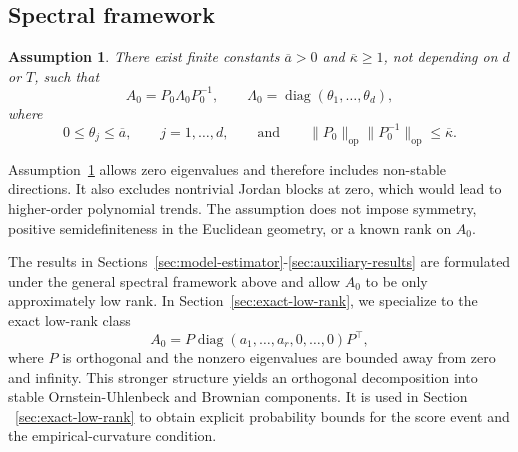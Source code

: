 \documentclass[11pt]{article}
\newtheorem{assumption}[theorem]{Assumption}
\newtheorem{remark}[theorem]{Remark}
\begin{document}
\subsection{Spectral framework}
\label{subsec:spectral-framework}

\begin{assumption}
\label{ass:spectral-structure}
There exist finite constants $\overline a>0$ and $\overline\kappa\geq1$, not
depending on $d$ or $T$, such that
\[
    A_0=P_0\Lambda_0P_0^{-1},
    \qquad
    \Lambda_0=\operatorname{diag}(\theta_1,\ldots,\theta_d),
\]
where
\[
    0\leq\theta_j\leq\overline a,
    \qquad j=1,\ldots,d,
    \qquad\text{and}\qquad
    \|P_0\|_{\mathrm{op}}\|P_0^{-1}\|_{\mathrm{op}}
    \leq\overline\kappa.
\]
\end{assumption}

\noindent
Assumption~\ref{ass:spectral-structure} allows zero eigenvalues and therefore
includes non-stable directions. It also excludes nontrivial Jordan blocks at zero,
which would lead to higher-order polynomial trends. The assumption does not
impose symmetry, positive semidefiniteness in the Euclidean geometry, or a known
rank on $A_0$.



The results in Sections~\ref{sec:model-estimator}-\ref{sec:auxiliary-results}
are formulated under the general spectral framework above and allow $A_0$ to be
only approximately low rank. In Section~\ref{sec:exact-low-rank}, we specialize
to the exact low-rank class
\[
    A_0=P\operatorname{diag}(a_1,\ldots,a_r,0,\ldots,0)P^\top,
\]
where $P$ is orthogonal and the nonzero eigenvalues are bounded away from zero
and infinity. This stronger structure yields an orthogonal decomposition into
stable Ornstein-Uhlenbeck and Brownian components. It is used in
Section ~\ref{sec:exact-low-rank} to obtain
explicit probability bounds for the score event and the empirical-curvature
condition.
\end{document}
